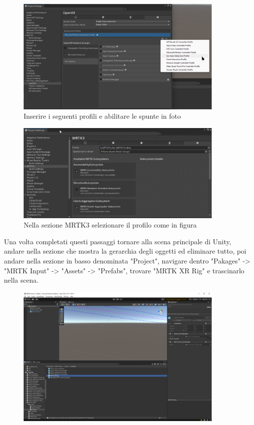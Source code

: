 \begin{figure}[H]
    \centering
    \includegraphics[width=0.9\textwidth,height=\textheight,keepaspectratio]{figures/chapter_1/projectSetting4.png}
    \caption{Inserire i seguenti profili e abilitare le spunte in foto}
\end{figure}
\begin{figure}[H]
    \centering
    \includegraphics[width=0.9\textwidth,height=\textheight,keepaspectratio]{figures/chapter_1/projectSetting5.png}
    \caption{Nella sezione MRTK3 selezionare il profilo come in figura}
\end{figure}
Una volta completati questi passaggi tornare alla scena principale di Unity, andare nella sezione che mostra la gerarchia degli oggetti ed eliminare tutto, poi andare nella sezione in basso denominata "Project", navigare dentro "Pakages" -> "MRTK Input" -> "Assets" -> "Prefabs", trovare "MRTK XR Rig" e trascinarlo nella scena.
\begin{figure}[H]
    \centering
    \includegraphics[width=0.9\textwidth,height=\textheight,keepaspectratio]{figures/chapter_1/mrtk-xr-rig-prefab.png}
    \caption{}
\end{figure}
